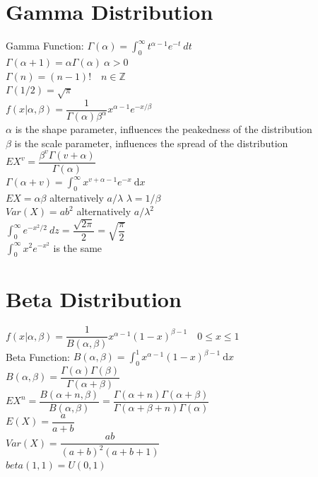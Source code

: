 \documentclass[openany]{book}
\newcommand{\dx}{\mathrm{d}x}
\begin{document}
\begin{flushleft}
\section{Gamma Distribution}
Gamma Function: $\Gamma(\alpha)=\int_{0}^{\infty}t^{\alpha-1}e^{-t} \ dt$\\
$\Gamma(\alpha+1)=\alpha \Gamma(\alpha) \ \alpha>0$\\
$\Gamma(n)=(n-1)! \quad n \in \mathbb{Z}$\\
$\Gamma(1/2)=\sqrt{\pi}$\\
$f(x|\alpha,\beta)=\dfrac{1}{\Gamma(\alpha) \beta^\alpha}x^{\alpha-1}e^{-x/\beta}$\\
$\alpha$ is the shape parameter, influences the peakedness of the distribution\\
$\beta$ is the scale parameter, influences the spread of the distribution\\
$EX^v=\dfrac{\beta^v \Gamma(v+\alpha)}{\Gamma(\alpha)}$\\
$\Gamma(\alpha+v)=\int_{0}^{\infty}x^{v+\alpha-1}e^{-x} \ \dx$\\
$EX=\alpha \beta$ alternatively $a/\lambda$ $\lambda=1/\beta$\\
$Var(X)=ab^2$ alternatively $a/\lambda^2$\\
$\int_{0}^{\infty}e^{-x^2/2} \ dz=\dfrac{\sqrt{2\pi}}{2}=\sqrt{\dfrac{\pi}{2}}$\\
$\int_{0}^{\infty}x^2e^{-x^2}$ is the same\\
\section{Beta Distribution}
$f(x|\alpha,\beta)=\dfrac{1}{B(\alpha,\beta)}x^{\alpha-1}(1-x)^{\beta-1} \quad 0\leq x\leq 1$\\
Beta Function: $B(\alpha,\beta)=\int_{0}^{1}x^{\alpha-1}(1-x)^{\beta-1} \ \dx$ \\ 
$B(\alpha,\beta)=\dfrac{\Gamma(\alpha)\Gamma(\beta)}{\Gamma(\alpha+\beta)}$\\
$EX^n=\dfrac{B(\alpha+n,\beta)}{B(\alpha,\beta)}=\dfrac{\Gamma(\alpha+n)\Gamma(\alpha+\beta)}{\Gamma(\alpha+\beta+n)\Gamma(\alpha)}$\\
$E(X)=\dfrac{a}{a+b}$\\
$Var(X)=\dfrac{ab}{(a+b)^2(a+b+1)}$\\
$beta(1,1)=U(0,1)$

\end{flushleft}
\end{document}
